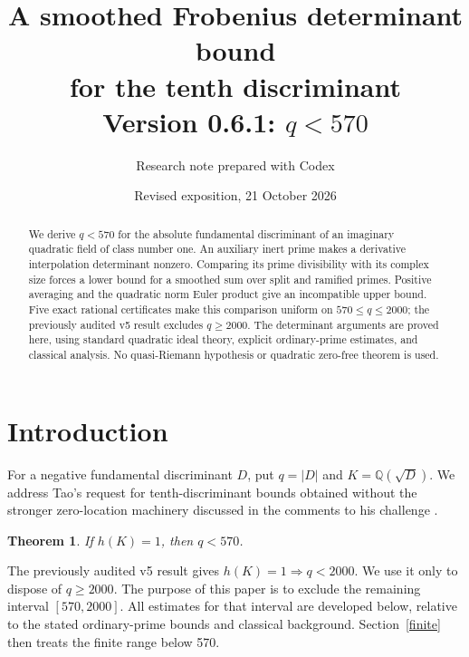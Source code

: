 \documentclass[11pt]{article}
\title{A smoothed Frobenius determinant bound\\for the tenth discriminant\\
\large Version 0.6.1: \(q<570\)}
\author{Research note prepared with Codex}
\date{Revised exposition, 21 October 2026}
\newtheorem{theorem}{Theorem}
\newcommand{\Q}{\mathbb Q}
\begin{document}
\maketitle

\begin{abstract}
We derive \(q<570\) for the absolute fundamental discriminant of an
imaginary quadratic field of class number one. An auxiliary inert prime
makes a derivative interpolation determinant nonzero. Comparing its
prime divisibility with its complex size forces a lower bound for a
smoothed sum over split and ramified primes. Positive averaging and the
quadratic norm Euler product give an incompatible upper bound. Five exact
rational certificates make this comparison uniform on
\(570\le q\le2000\); the previously audited v5 result excludes
\(q\ge2000\). The determinant arguments are proved here, using standard
quadratic ideal theory, explicit ordinary-prime estimates, and classical
analysis. No quasi-Riemann hypothesis or quadratic zero-free theorem is used.
\end{abstract}

\section{Introduction}
For a negative fundamental discriminant \(D\), put \(q=|D|\) and
\(K=\Q(\sqrt D)\). We address Tao's request for tenth-discriminant
bounds obtained without the stronger zero-location machinery discussed
in the comments to his challenge \cite{tao,taocomment}.

\begin{theorem}\label{main}
If \(h(K)=1\), then \(q<570\).
\end{theorem}

The previously audited v5 result \cite{v5} gives
\(h(K)=1\Rightarrow q<2000\). We use it only to dispose of
\(q\ge2000\). The purpose of this paper is to exclude the remaining
interval \([570,2000]\). All estimates for that interval are developed
below, relative to the stated ordinary-prime bounds and classical
background. Section~\ref{finite} then treats the finite range below 570.
\end{document}
